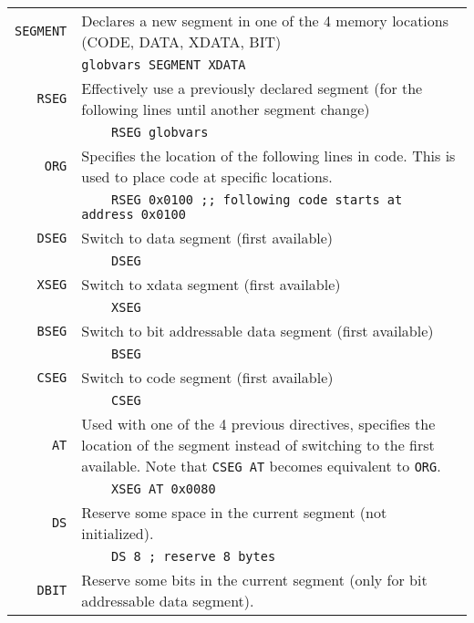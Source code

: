 \documentclass{article}
\begin{document}
\noindent
\begin{tabularx}{\textwidth}{rX}
  \texttt{SEGMENT}&Declares a new segment in one of the 4 memory
  locations (CODE, DATA, XDATA, BIT)\\
  &\texttt{globvars SEGMENT XDATA}\\
  \noalign{\smallskip}
  \hline
  \noalign{\smallskip}
  \texttt{RSEG}&Effectively use a previously declared segment (for the
  following lines until another segment change)\\
  &\texttt{\ \ \ \ RSEG globvars}\\
  \noalign{\smallskip}
  \hline
  \noalign{\smallskip}
  \texttt{ORG}&Specifies the location of the following lines in
  code. This is used to place code at specific locations.\\
  &\texttt{\ \ \ \ RSEG 0x0100 ;; following code starts at address 0x0100}\\
  \noalign{\smallskip}
  \hline
  \noalign{\smallskip}
  \texttt{DSEG}&Switch to data segment (first available)\\
  &\texttt{\ \ \ \ DSEG}\\
  \noalign{\smallskip}
  \hline
  \noalign{\smallskip}
  \texttt{XSEG}&Switch to xdata segment (first available)\\
  &\texttt{\ \ \ \ XSEG}\\
  \noalign{\smallskip}
  \hline
  \noalign{\smallskip}
  \texttt{BSEG}&Switch to bit addressable data segment (first available)\\
  &\texttt{\ \ \ \ BSEG}\\
  \noalign{\smallskip}
  \hline
  \noalign{\smallskip}
  \texttt{CSEG}&Switch to code segment (first available)\\
  &\texttt{\ \ \ \ CSEG}\\
  \noalign{\smallskip}
  \hline
  \noalign{\smallskip}
  \texttt{AT}&Used with one of the 4 previous directives, specifies
  the location of the segment instead of switching to the first
  available. Note that \texttt{CSEG AT} becomes equivalent to \texttt{ORG}.\\
  &\texttt{\ \ \ \ XSEG AT 0x0080}\\
  \noalign{\smallskip}
  \hline
  \noalign{\smallskip}
  \texttt{DS}&Reserve some space in the current segment (not initialized).\\
  &\texttt{\ \ \ \ DS 8 ; reserve 8 bytes}\\
  \noalign{\smallskip}
  \hline
  \noalign{\smallskip}
  \texttt{DBIT}&Reserve some bits in the current segment (only for bit
  addressable data segment).\\

\end{tabularx}
\end{document}
